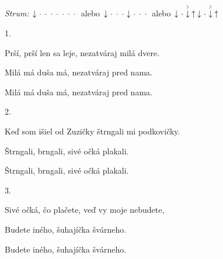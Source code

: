 \begin{song}


\begin{headerbox}
\RaiseBoxWithAccents
\textit{Strum:} $\Down\Miss\Miss\Miss\Miss\Miss\Miss\Miss$
alebo $\Down\Miss\Miss\Miss\Down\Miss\Miss\Miss$
alebo $\Down\Miss\AccentDown\Up\Down\Miss\AccentDown\Up$
\end{headerbox}

\begin{hchordbox}
 \quad
{} \quad
{}
\end{hchordbox}

\Large

\bigskip

1. \par
{}Prší, prší len sa leje, nezatváraj milá dvere. \par
{}Milá má duša má, nezatváraj pred nama. \par
{}Milá má duša má, nezatváraj pred nama. \par

\bigskip

2. \par
{}Keď som išiel od Zuzičky štrngali mi podkovičky. \par
{}Štrngali, brngali, sivé očká plakali. \par
{}Štrngali, brngali, sivé očká plakali. \par

\bigskip

3. \par
{}Sivé očká, čo plačete, veď vy moje nebudete, \par
{}Budete iného, šuhajíčka švárneho. \par
{}Budete iného, šuhajíčka švárneho. \par

\end{song}
